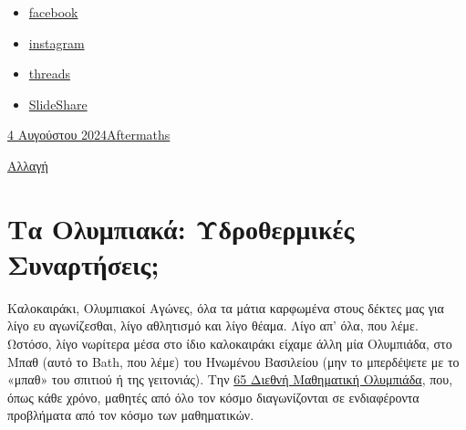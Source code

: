 \documentclass[
]{article}
\providecommand{\tightlist}{%
  \setlength{\itemsep}{0pt}\setlength{\parskip}{0pt}}
\begin{document}
\begin{itemize}
\tightlist
\item
  \protect\hypertarget{menu-item-3259}{}{\href{https://www.facebook.com/aftermaths.gr/}{{facebook}}}
\item
  \protect\hypertarget{menu-item-3113}{}{\href{https://www.instagram.com/aftermathsgr/}{{instagram}}}
\item
  \protect\hypertarget{menu-item-13056}{}{\href{https://www.threads.net/@aftermathsgr}{{threads}}}
\item
  \protect\hypertarget{menu-item-3041}{}{\href{https://www.slideshare.net/ssuserbf550d}{{SlideShare}}}
\end{itemize}

\hypertarget{content}{}
\hypertarget{primary}{}
\hypertarget{main}{}
{\href{https://aftermathsgr.wordpress.com/2024/08/04/\%cf\%84\%ce\%b1-\%ce\%bf\%ce\%bb\%cf\%85\%ce\%bc\%cf\%80\%ce\%b9\%ce\%b1\%ce\%ba\%ce\%ac-\%cf\%85\%ce\%b4\%cf\%81\%ce\%bf\%ce\%b8\%ce\%b5\%cf\%81\%ce\%bc\%ce\%b9\%ce\%ba\%ce\%ad\%cf\%82-\%cf\%83\%cf\%85\%ce\%bd\%ce\%b1\%cf\%81\%cf\%84\%ce\%ae\%cf\%83\%ce\%b5/}{4
Αυγούστου 2024}}{
{\href{https://aftermathsgr.wordpress.com/author/aftermathsgr/}{Aftermaths}}}

{\href{https://aftermathsgr.wordpress.com/wp-admin/post.php?post=13786\&action=edit}{Αλλαγή}}

\hypertarget{ux3c4ux3b1-ux3bfux3bbux3c5ux3bcux3c0ux3b9ux3b1ux3baux3ac-ux3c5ux3b4ux3c1ux3bfux3b8ux3b5ux3c1ux3bcux3b9ux3baux3adux3c2-ux3c3ux3c5ux3bdux3b1ux3c1ux3c4ux3aeux3c3ux3b5ux3b9ux3c2}{%
\section{Τα Ολυμπιακά: Υδροθερμικές
Συναρτήσεις;}\label{ux3c4ux3b1-ux3bfux3bbux3c5ux3bcux3c0ux3b9ux3b1ux3baux3ac-ux3c5ux3b4ux3c1ux3bfux3b8ux3b5ux3c1ux3bcux3b9ux3baux3adux3c2-ux3c3ux3c5ux3bdux3b1ux3c1ux3c4ux3aeux3c3ux3b5ux3b9ux3c2}}

Καλοκαιράκι, Ολυμπιακοί Αγώνες, όλα τα μάτια καρφωμένα στους δέκτες μας
για λίγο ευ αγωνίζεσθαι, λίγο αθλητισμό και λίγο θέαμα. Λίγο απ' όλα,
που λέμε. Ωστόσο, λίγο νωρίτερα μέσα στο ίδιο καλοκαιράκι είχαμε άλλη
μία Ολυμπιάδα, στο Μπαθ (αυτό το Bath, που λέμε) του Ηνωμένου Βασιλείου
(μην το μπερδέψετε με το «μπαθ» του σπιτιού ή της γειτονιάς). Την
\href{https://www.imo2024.uk/}{65 Διεθνή Μαθηματική Ολυμπιάδα}, που,
όπως κάθε χρόνο, μαθητές από όλο τον κόσμο διαγωνίζονται σε ενδιαφέροντα
προβλήματα από τον κόσμο των μαθηματικών.
\end{document}
